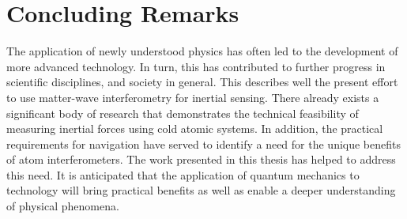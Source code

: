 \section{Concluding Remarks}
The application of newly understood physics has often led to the
development of more advanced technology. In turn, this has contributed
to further progress in scientific disciplines, and society in general.
This describes well the present effort to use matter-wave
interferometry for inertial sensing. There already exists a significant
body of research that demonstrates the technical feasibility of
measuring inertial forces using cold atomic systems. In addition, the
practical requirements for navigation have served to identify a need
for the unique benefits of atom interferometers. The work presented
in this thesis has helped to address this need. It is anticipated that
the application of quantum mechanics to technology will
bring practical benefits as well as enable a deeper understanding of
physical phenomena.
\let\clearpage\relax
